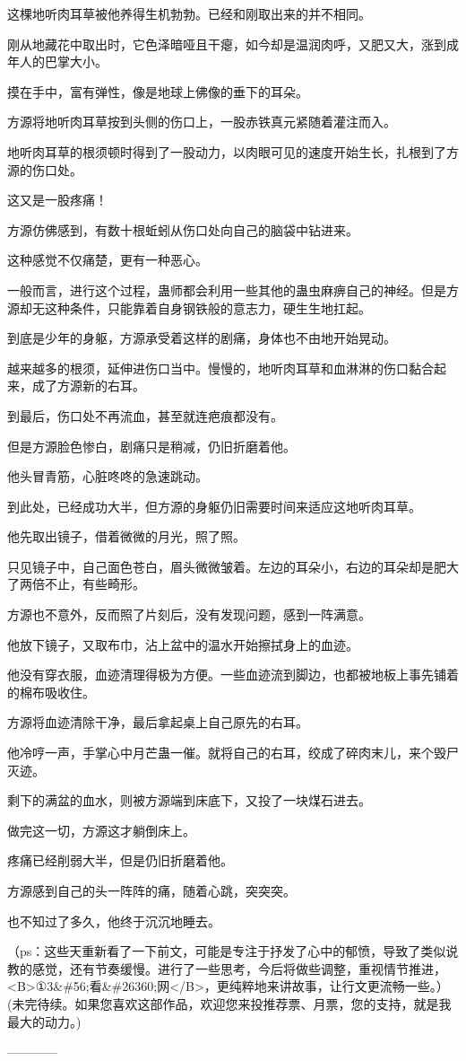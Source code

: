 \begin{this_body}
这棵地听肉耳草被他养得生机勃勃。已经和刚取出来的并不相同。

刚从地藏花中取出时，它色泽暗哑且干瘪，如今却是温润肉呼，又肥又大，涨到成年人的巴掌大小。

摸在手中，富有弹性，像是地球上佛像的垂下的耳朵。

方源将地听肉耳草按到头侧的伤口上，一股赤铁真元紧随着灌注而入。

地听肉耳草的根须顿时得到了一股动力，以肉眼可见的速度开始生长，扎根到了方源的伤口处。

这又是一股疼痛！

方源仿佛感到，有数十根蚯蚓从伤口处向自己的脑袋中钻进来。

这种感觉不仅痛楚，更有一种恶心。

一般而言，进行这个过程，蛊师都会利用一些其他的蛊虫麻痹自己的神经。但是方源却无这种条件，只能靠着自身钢铁般的意志力，硬生生地扛起。

到底是少年的身躯，方源承受着这样的剧痛，身体也不由地开始晃动。

越来越多的根须，延伸进伤口当中。慢慢的，地听肉耳草和血淋淋的伤口黏合起来，成了方源新的右耳。

到最后，伤口处不再流血，甚至就连疤痕都没有。

但是方源脸色惨白，剧痛只是稍减，仍旧折磨着他。

他头冒青筋，心脏咚咚的急速跳动。

到此处，已经成功大半，但方源的身躯仍旧需要时间来适应这地听肉耳草。

他先取出镜子，借着微微的月光，照了照。

只见镜子中，自己面色苍白，眉头微微皱着。左边的耳朵小，右边的耳朵却是肥大了两倍不止，有些畸形。

方源也不意外，反而照了片刻后，没有发现问题，感到一阵满意。

他放下镜子，又取布巾，沾上盆中的温水开始擦拭身上的血迹。

他没有穿衣服，血迹清理得极为方便。一些血迹流到脚边，也都被地板上事先铺着的棉布吸收住。

方源将血迹清除干净，最后拿起桌上自己原先的右耳。

他冷哼一声，手掌心中月芒蛊一催。就将自己的右耳，绞成了碎肉末儿，来个毁尸灭迹。

剩下的满盆的血水，则被方源端到床底下，又投了一块煤石进去。

做完这一切，方源这才躺倒床上。

疼痛已经削弱大半，但是仍旧折磨着他。

方源感到自己的头一阵阵的痛，随着心跳，突突突。

也不知过了多久，他终于沉沉地睡去。

（ps：这些天重新看了一下前文，可能是专注于抒发了心中的郁愤，导致了类似说教的感觉，还有节奏缓慢。进行了一些思考，今后将做些调整，重视情节推进，<B>①3\&\#56;看\&\#26360;网</B>，更纯粹地来讲故事，让行文更流畅一些。）(未完待续。如果您喜欢这部作品，欢迎您来投推荐票、月票，您的支持，就是我最大的动力。)

------------

\end{this_body}

